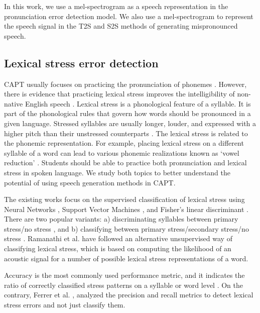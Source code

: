 \documentclass[]{interact}
\theoremstyle{plain}%
\theoremstyle{definition}
\theoremstyle{remark}
\begin{document}
In this work, we use a mel-spectrogram as a speech representation in the pronunciation error detection model. We also use a mel-spectrogram to represent the speech signal in the T2S and S2S methods of generating mispronounced speech.

\subsection{Lexical stress error detection} 

CAPT usually focuses on practicing the pronunciation of phonemes \cite{witt2000phone, leung2019cnn, korzekwa2021mispronunciation}. However, there is evidence that practicing lexical stress improves the intelligibility of non-native English speech \cite{field2005intelligibility,lepage2014intelligibility}. Lexical stress is a phonological feature of a syllable. It is part of the phonological rules that govern how words should be pronounced in a given language. Stressed syllables are usually longer, louder, and expressed with a higher pitch than their unstressed counterparts \cite{jung2018acoustic}. The lexical stress is related to the phonemic representation. For example, placing lexical stress on a different syllable of a word can lead to various phonemic realizations known as `vowel reduction' \cite{bergem1991acoustic}. Students should be able to practice both pronunciation and lexical stress in spoken language. We study both topics to better understand the potential of using speech generation methods in CAPT.

The existing works focus on the supervised classification of lexical stress using Neural Networks \cite{li2018automatic, shahin2016automatic}, Support Vector Machines \cite{chen2010automatic_2, zhao2011automatic}, and Fisher’s linear
discriminant \cite{chen2007using}. There are two popular variants: a) discriminating syllables between primary stress/no stress \cite{ferrer2015classification}, and b) classifying between primary stress/secondary stress/no stress \cite{li2013lexical,li2018automatic}. Ramanathi et al. \cite{ramanathi2019asr} have followed an alternative unsupervised way of classifying lexical stress, which is based on computing the likelihood of an acoustic signal for a number of possible lexical stress representations of a word.  

Accuracy is the most commonly used performance metric, and it indicates the ratio of correctly classified stress patterns on a syllable \cite{li2013lexical} or word level \cite{chen2010automatic_2}. On the contrary, Ferrer et al. \cite{ferrer2015classification}, analyzed the precision and recall metrics to detect lexical stress errors and not just classify them.
\end{document}
